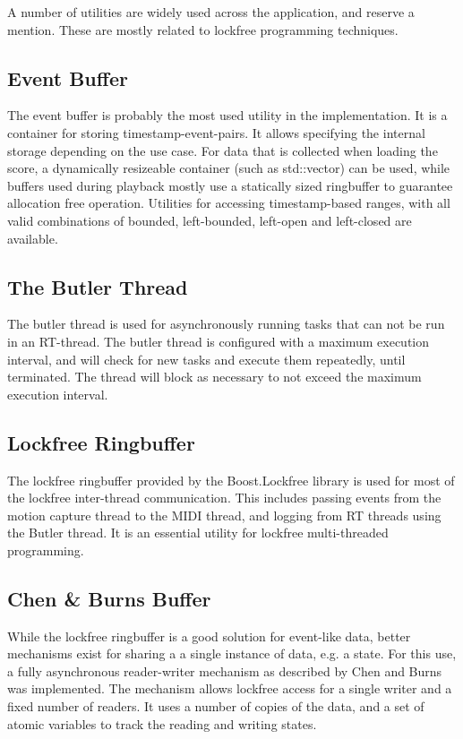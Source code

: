 A number of utilities are widely used across the application,
and reserve a mention.
These are mostly related to lockfree programming techniques.

\subsection{Event Buffer}

The event buffer is probably the most used utility in the implementation.
It is a container for storing timestamp-event-pairs.
It allows specifying the internal storage depending on the use case.
For data that is collected when loading the score,
a dynamically resizeable container (such as std::vector) can be used,
while buffers used during playback mostly use a statically sized ringbuffer
to guarantee allocation free operation.
Utilities for accessing timestamp-based ranges,
with all valid combinations of
bounded, left-bounded, left-open and left-closed are available.

\subsection{The Butler Thread}

The butler thread is used for asynchronously running
tasks that can not be run in an RT-thread.
The butler thread is configured with a maximum execution interval,
and will check for new tasks and execute them repeatedly,
until terminated.
The thread will block as necessary to not exceed the
maximum execution interval.

\subsection{Lockfree Ringbuffer}

The lockfree ringbuffer provided by
the Boost.Lockfree library \cite{BoostLockfree}
is used for most of the lockfree inter-thread communication.
This includes passing events from the motion capture thread
to the MIDI thread, and logging from RT threads using the Butler thread.
It is an essential utility for lockfree multi-threaded programming.

\subsection{Chen \& Burns Buffer}

While the lockfree ringbuffer is a good solution
for event-like data,
better mechanisms exist for sharing a a single
instance of data, e.g. a state. 
For this use, a fully asynchronous reader-writer mechanism
as described by Chen and Burns \cite{Chen97} was implemented.
The mechanism allows lockfree access for
a single writer and a fixed number of readers.
It uses a number of copies of the data,
and a set of atomic variables to track
the reading and writing states.

